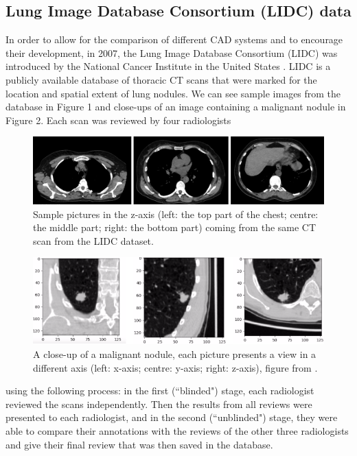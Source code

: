 \documentclass[12pt]{article}
\begin{document}
\subsection{Lung Image Database Consortium (LIDC) data}
 In order to allow for the comparison of different CAD systems and to encourage their development, in 2007, the Lung Image Database Consortium (LIDC) was introduced by the National Cancer Institute in the United States \citep{mcnitt2007lung}. LIDC is a publicly available database of thoracic CT scans that were marked for the location and spatial extent of lung nodules. We can see sample images from the database in Figure 1 and close-ups of an image containing a malignant nodule in Figure 2. Each scan was reviewed by four radiologists
\begin{figure}[h!]
\centering
\includegraphics[scale = 0.335]{lung.png}
\caption{Sample pictures in the z-axis (left: the top part of the chest; centre: the middle part; right: the bottom part) coming from the same CT scan from the LIDC dataset.}
\end{figure}
\begin{figure}[h!]
\centering
\includegraphics[scale = 0.575]{nodule.png}
\caption{A close-up of a malignant nodule, each picture presents a view in a different axis (left: x-axis; centre: y-axis; right: z-axis), figure from \citep{deepbreath}.}
\end{figure}
 using the following process: in the first (``blinded") stage, each radiologist reviewed the scans independently. Then the results from all reviews were presented to each radiologist, and in the second (``unblinded") stage, they were able to compare their annotations with the reviews of the other three radiologists and give their final review that was then saved in the database.
\end{document}

